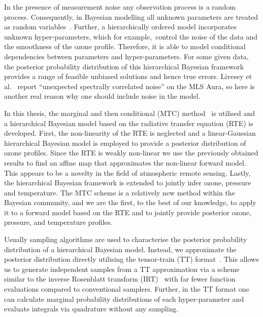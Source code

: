 In the presence of measurement noise any observation process is a random process.
Consequently, in Bayesian modelling all unknown parameters are treated as random variables~\cite{kaipio2005statinv}.
Further, a hierarchically ordered model incorporates unknown hyper-parameters, which for example,~control the noise of the data and the smoothness of the ozone profile.
Therefore, it is able to model conditional dependencies between parameters and hyper-parameters.
For some given data, the posterior probability distribution of this hierarchical Bayesian framework provides a range of feasible unbiased solutions and hence true errors.
Livesey et al.~\cite{livesey2006retrieval} report ``unexpected spectrally correlated noise'' on the MLS Aura, so here is another real reason why one should include noise in the model.

In this thesis, the marginal and then conditional (MTC) method~\cite{fox2016fast} is utilised and a hierarchical Bayesian model based on the radiative transfer equation (RTE) is developed.
First, the non-linearity of the RTE is neglected and a linear-Gaussian hierarchical Bayesian model is employed to provide a posterior distribution of ozone profiles.
Since the RTE is weakly non-linear we use the previously obtained results to find an affine map that approximates the non-linear forward model.
This appears to be a novelty in the field of atmospheric remote sensing.
Lastly, the hierarchical Bayesian framework is extended to jointly infer ozone, pressure and temperature.
The MTC scheme is a relatively new method within the Bayesian community, and we are the first, to the best of our knowledge, to apply it to a forward model based on the RTE and to jointly provide posterior ozone, pressure, and temperature profiles.

Usually sampling algorithms are used to characterise the posterior probability distribution of a hierarchical Bayesian model. Instead, we approximate the posterior distribution directly utilising the tensor-train (TT) format~\cite{cui2022deep}. 
This allows us to generate independent samples from a TT approximation via a scheme similar to the inverse Rosenblatt transform (IRT)~\cite{dolgov2020approximation} with far fewer function evaluations compared to conventional samplers.
Further, in the TT format one can calculate marginal probability distributions of each hyper-parameter and evaluate integrals via quadrature without any sampling.


